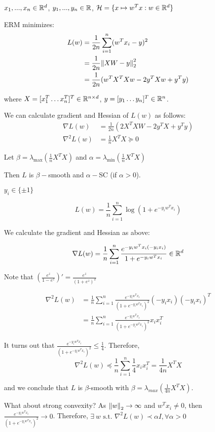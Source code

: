 

\begin{eg} $x_1,...,x_n \in \mathbb{R}^d$, $y_1,...,y_n \in \mathbb{R}$, $\mathcal{H} = \{ x \mapsto w^Tx : w \in \mathbb{R}^d \}$

    ERM minimizes: 
    \begin{align*}
        L(w) &= \frac{1}{2n} \sum_{i=1}^n (w^Tx_i - y)^2 \\ 
        &= \frac{1}{2n} \norm{XW - y}_2^2  \\
        &= \frac{1}{2n} (w^TX^TXw -2y^TXw+y^Ty) 
    \end{align*}

    where $X = [x_1^T \ldots x_n^T]^T \in \mathbb{R}^{n \times d}$, $y = [y_1 \ldots y_n]^T \in \mathbb{R}^n$.

    We can calculate gradient and Hessian of \(L(w)\) as follows: 
    \begin{align*}
        \nabla L(w) &= \frac{1}{2n} \left(
         2 X^T X W - 2y^TX + y^Ty \right) \\ 
         \nabla^2 L(w) &= \frac{1}{n} X^TX \succeq 0 
    \end{align*}

    Let \(\beta = \lambda_{\text{max}} (\frac{1}{n}X^TX)\) and 
    \(\alpha = \lambda_{\text{min}}(\frac{1}{n}X^TX)\)

    Then \(L\) is \(\beta-\)smooth and \(\alpha-\)SC (if \(\alpha > 0\)). 
\end{eg}

\begin{eg} \(y_i \in \{\pm 1\}\) 

    $$L(w) = \frac{1}{n}\sum_{i=1}^n \log \left(1 + e^{- y_i w^Tx_i}\right)$$

    We calculate the gradient and Hessian as above: 

    $$\nabla L(w) = \frac{1}{n}\sum_{i=1}^n \frac{e^{-y_i w^T x_i (-y_i x_i)}}{1+e^{-y_i w^T x_i}} \in \mathbb{R}^d$$

    Note that \((\frac{e^z}{1 - e^z})' = \frac{e^z}{(1 + e^z)^2}\)

    \begin{align*}
        \nabla^2 L(w) &= \frac{1}{n}\sum_{i=1}^n \frac{e^{-y_i w^T x_i }}{(1 + e^{-y_i w^T x_i })^2} (-y_ix_i)(-y_ix_i)^T \\ 
        &= \frac{1}{n}\sum_{i=1}^n \frac{e^{-y_i w^T x_i}}{(1 + e^{-y_i w^T x_i })^2} x_i x_i^T
    \end{align*}

    It turns out that $\frac{e^{-y_i w^T x_i}}{(1 + e^{-y_i w^T x_i })^2} \leq \frac{1}{4}$. Therefore,
    $$\nabla^2 L(w) \preceq \frac{1}{n} \sum_{i=1}^n \frac{1}{4}x_ix_i^T = \frac{1}{4n}X^TX$$

    and we conclude that $L$ is $\beta$-smooth with $\beta=\lambda_{max}(\frac{1}{4n}X^TX)$. \newline
    
    What about strong convexity? As \(\norm{w}_2 \to \infty\) and \(w^T x_i \neq 0\), then \(\frac{e^{-y_i w^T x_i}}{(1 + e^{-y_i w^T x_i })^2} \to 0\). Therefore, \( \exists \ w \text{ s.t. }\nabla^2 L(w) \prec \alpha I, \forall \alpha > 0\)
\end{eg}


